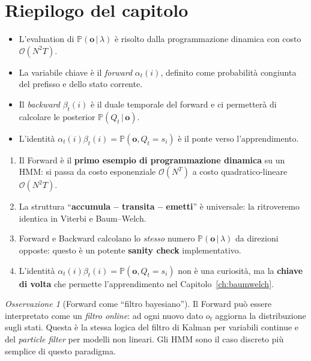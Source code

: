 \documentclass[11pt,a4paper,oneside]{book}
\theoremstyle{plain}
\theoremstyle{definition}
\theoremstyle{remark}
\newtheorem{osservazione}[teorema]{Osservazione}
\newcommand{\Prob}{\mathbb{P}}
\newcommand{\hmm}{\lambda}                   %
\newcommand{\Nstates}{N}                     %
\newcommand{\Tlen}{T}                        %
\newcommand{\seqobs}{\mathbf{o}}             %
\newcommand{\fwd}{\alpha}                    %
\newcommand{\bwd}{\beta}                     %
\newcommand{\given}{\,\vert\,}
\begin{document}
\section{Riepilogo del capitolo}

\begin{itemize}[leftmargin=*]
    \item L'evaluation di $\Prob(\seqobs\given\hmm)$ è risolto dalla
          programmazione dinamica con costo $\mathcal{O}(\Nstates^2\Tlen)$.
    \item La variabile chiave è il \emph{forward} $\fwd_t(i)$, definito
          come probabilità congiunta del prefisso e dello stato corrente.
    \item Il \emph{backward} $\bwd_t(i)$ è il duale temporale del forward
          e ci permetterà di calcolare le posterior $\Prob(Q_t\given\seqobs)$.
    \item L'identità $\fwd_t(i)\bwd_t(i)=\Prob(\seqobs,Q_t=s_i)$ è il
          ponte verso l'apprendimento.
\end{itemize}

\begin{tcolorbox}[insightbox,title=Takeaway -- Capitolo 3]
\begin{enumerate}[leftmargin=*]
    \item Il Forward è il \textbf{primo esempio di programmazione
          dinamica} su un HMM: si passa da costo esponenziale
          $\mathcal{O}(\Nstates^{\Tlen})$ a costo quadratico-lineare
          $\mathcal{O}(\Nstates^2\Tlen)$.
    \item La struttura ``\textbf{accumula -- transita -- emetti}'' è
          universale: la ritroveremo identica in Viterbi e Baum--Welch.
    \item Forward e Backward calcolano lo \emph{stesso} numero
          $\Prob(\seqobs\given\hmm)$ da direzioni opposte: questo è un
          potente \textbf{sanity check} implementativo.
    \item L'identità $\fwd_t(i)\bwd_t(i) = \Prob(\seqobs,Q_t{=}s_i)$
          non è una curiosità, ma la \textbf{chiave di volta} che
          permette l'apprendimento nel Capitolo~\ref{ch:baumwelch}.
\end{enumerate}
\end{tcolorbox}

\begin{osservazione}[Forward come ``filtro bayesiano'']
Il Forward può essere interpretato come un \emph{filtro online}:
ad ogni nuovo dato $o_t$ aggiorna la distribuzione sugli stati.
Questa è la stessa logica del filtro di Kalman per variabili
continue e del \emph{particle filter} per modelli non lineari.
Gli HMM sono il caso discreto più semplice di questo paradigma.
\end{osservazione}
\end{document}
